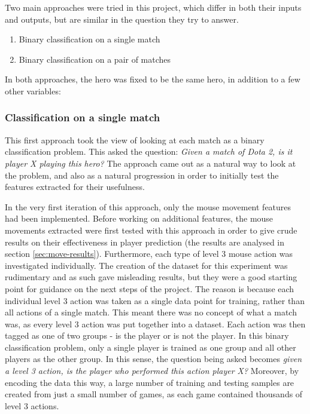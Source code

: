 \documentclass[Report.tex]{subfiles}
\begin{document}
Two main approaches were tried in this project, which differ in both their inputs and outputs, but are similar in the question they try to answer.
\begin{enumerate}
\item Binary classification on a single match
\item Binary classification on a pair of matches
\end{enumerate}

In both approaches, the hero was fixed to be the same hero, in addition to a few other variables:

\subsubsection{Classification on a single match}
This first approach took the view of looking at each match as a binary classification problem. This asked the question: \textit{Given a match of Dota 2, is it player X playing this hero?} The approach came out as a natural way to look at the problem, and also as a natural progression in order to initially test the features extracted for their usefulness.

In the very first iteration of this approach, only the mouse movement features had been implemented. Before working on additional features, the mouse movements extracted were first tested with this approach in order to give crude results on their effectiveness in player prediction (the results are analysed in section \ref{sec:move-results}). Furthermore, each type of level 3 mouse action was investigated individually. The creation of the dataset for this experiment was rudimentary and as such gave misleading results, but they were a good starting point for guidance on the next steps of the project. The reason is because each individual level 3 action was taken as a single data point for training, rather than all actions of a single match. This meant there was no concept of what a match was, as every level 3 action was put together into a dataset. Each action was then tagged as one of two groups - is the player or is not the player. In this binary classification problem, only a single player is trained as one group and all other players as the other group. In this sense, the question being asked becomes \textit{given a level 3 action, is the player who performed this action player X?} Moreover, by encoding the data this way, a large number of training and testing samples are created from just a small number of games, as each game contained thousands of level 3 actions.
\end{document}
